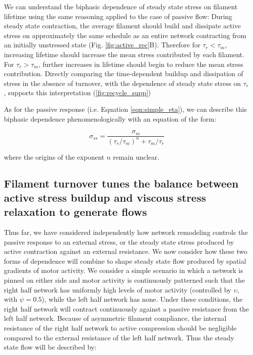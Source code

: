 We can understand the biphasic dependence of steady state stress on filament lifetime using the same reasoning applied to the case of passive flow:   During steady state contraction, the average filament should build and dissipate active stress on approximately the same schedule as an entire network contracting from an initially unstressed state (Fig. \ref{fig:active_rec}B). Therefore for $\tau_r < \tau_m$, increasing lifetime should increase the mean stress contributed by each filament. For $\tau_r > \tau_m$, further increases in lifetime should begin to reduce the mean stress contribution. Directly comparing the time-dependent buildup and dissipation of stress in the absence of turnover, with the dependence of steady state stress on $\tau_r$, supports this interpretation (\ref{fig:recycle_supp})  


As for the passive response (i.e. Equation \ref{eqn:simple_eta}), we can describe this biphasic dependence phenomenologically with an equation of the form:

\begin{equation}
	\label{eqn:simple_sigma}
	\sigma_{ss} = \frac{\sigma_m}{(\tau_r/\tau_m)^n+\tau_m/\tau_r}  
\end{equation}

where the origins of the exponent $n$ remain unclear.




\subsection{Filament turnover tunes the balance between active stress buildup and viscous stress relaxation to generate flows}

Thus far, we have considered independently how network remodeling controls the passive response to an external stress, or the steady state stress produced by active contraction against an external resistance. We now consider how these two forms of dependence will combine to shape steady state flow produced by spatial gradients of motor activity. We consider a simple scenario in which a network is pinned on either side and motor activity is continuously patterned such that the right half network has uniformly high levels of motor activity (controlled by $\upsilon$, with $\psi = 0.5$), while the left half network has none. Under these conditions, the right half network will contract continuously against a passive resistance from the left half network.  Because of asymmetric filament compliance, the internal resistance of the right half network to active compression should be negligible compared to the external resistance of the left half network.  Thus the steady state flow will be described by:

